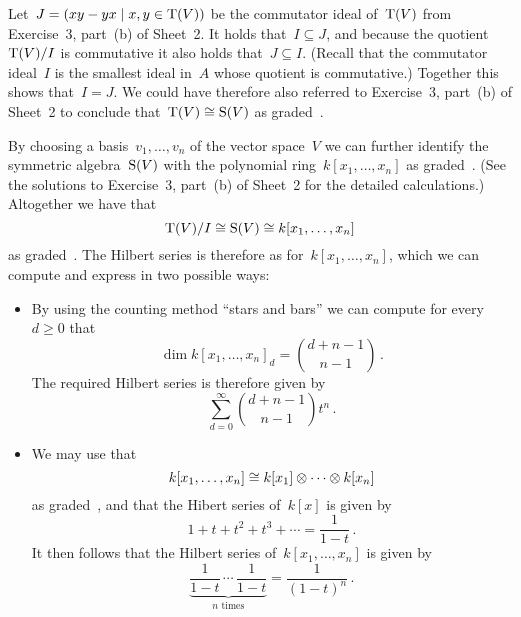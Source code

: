 \begin{remark}
  Let~$J = \genideal{xy - yx \suchthat x, y \in \Tensor(V)}$ be the commutator ideal of~$\operatorname{T}(V)$ from Exercise~3, part~(b) of Sheet~2.
  It holds that~$I \subseteq J$, and because the quotient~$\operatorname{T}(V)/I$ is commutative it also holds that~$J \subseteq I$.
  (Recall that the commutator ideal~$I$ is the smallest {\twosided} ideal in~$A$ whose quotient is commutative.)
  Together this shows that~$I = J$.
  We could have therefore also referred to Exercise~3, part~(b) of Sheet~2 to conclude that~$\operatorname{T}(V) \cong \operatorname{S}(V)$ as graded~{\kalgs}.
\end{remark}

By choosing a basis~$v_1, \dotsc, v_n$ of the vector space~$V$ we can further identify the symmetric algebra~$\operatorname{S}(V)$ with the polynomial ring~$k[x_1, \dotsc, x_n]$ as graded~{\kalgs}.
(See the solutions to Exercise~3, part~(b) of Sheet~2 for the detailed calculations.)
Altogether we have that
\[
        \operatorname{T}(V)/I
  \cong \operatorname{S}(V)
  \cong k[x_1, \dotsc, x_n]
\]
as graded~{\kalgs}.
The Hilbert series is therefore as for~$k[x_1, \dotsc, x_n]$, which we can compute and express in two possible ways:

\begin{itemize}
  \item
    By using the counting method \enquote{stars and bars} we can compute for every~$d \geq 0$ that
    \[
        \dim k[x_1, \dotsc, x_n]_d
      = \binom{d + n-1}{n-1} \,.
    \]
    The required Hilbert series is therefore given by
    \[
      \sum_{d=0}^\infty \binom{d + n-1}{n-1} t^n \,.
    \]
  \item
    We may use that
    \[
            k[x_1, \dotsc, x_n]
      \cong k[x_1] \otimes \dotsb \otimes k[x_n]
    \]
    as graded~{\kalgs}, and that the Hibert series of~$k[x]$ is given by
    \[
        1 + t + t^2 + t^3 + \dotsb
      = \frac{1}{1-t} \,.
    \]
    It then follows that the Hilbert series of~$k[x_1, \dotsc, x_n]$ is given by
    \[
        \underbrace{\frac{1}{1-t} \, \dotsm \, \frac{1}{1-t}}_{\text{$n$ times}}
      = \frac{1}{(1-t)^n} \,.
    \]
\end{itemize}






